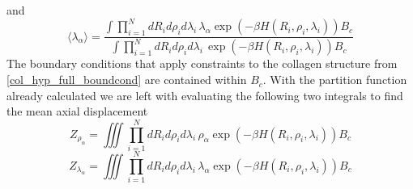 %
and
%
\begin{equation}
\label{col_mxd_lambda}
\langle\lambda_{\alpha}\rangle=\frac{\int \prod^{N}_{i=1}dR_{i}d\rho_{i}d\lambda_{i}\,\lambda_{\alpha}\exp\left(-\beta H\left(R_{i},\rho_{i},\lambda_{i}\right)\right)B_c}{\int \prod^{N}_{i=1}dR_{i}d\rho_{i}d\lambda_{i}\,\exp\left(-\beta H\left(R_{i},\rho_{i},\lambda_{i}\right)\right)B_c}
\end{equation}
%
The boundary conditions that apply constraints to the collagen structure from \eqref{col_hyp_full_boundcond} are contained within $B_c$. With the partition function already calculated we are left with evaluating the following two integrals to find the mean axial displacement
%
\begin{equation}
\label{col_mxd_z_rho}
Z_{\rho_\alpha}=\iiint \prod^{N}_{i=1}dR_{i}d\rho_{i}d\lambda_{i}\,\rho_{\alpha}\exp\left(-\beta H\left(R_{i},\rho_{i},\lambda_{i}\right)\right)B_c
\end{equation}
%
\begin{equation}
\label{col_mxd_z_lambda}
Z_{\lambda_\alpha}=\iiint \prod^{N}_{i=1}dR_{i}d\rho_{i}d\lambda_{i}\,\lambda_{\alpha}\exp\left(-\beta H\left(R_{i},\rho_{i},\lambda_{i}\right)\right)B_c
\end{equation}
%
